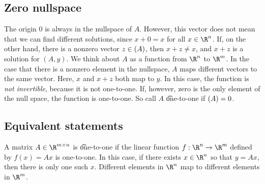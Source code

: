 \subsection*{Zero nullspace}

The origin $0$ is always in the nullspace of $A$.
However, this vector does not mean that we can find different solutions, since $x + 0 = x$ for all $x \in \R ^n$.
If, on the other hand, there is a nonzero vector $z \in \null(A)$, then $x + z \neq x$, and $x+z$ is a solution for $(A, y)$.
We think about $A$ as a function from $\R ^n$ to $\R ^m$.
In the case that there is a nonzero element in the nullspace, $A$ maps different vectors to the same vector.
Here, $x$ and $x + z$ both map to $y$.
In this case, the function is \textit{not invertible}, because it is not one-to-one.
If, however, zero is the only element of the null space, the function is one-to-one.
So call $A$ \t{one-to-one} if $\null(A) = 0$.

\subsection*{Equivalent statements}

A matrix $A \in \R ^{m \times  n}$ is \t{one-to-one} if the linear function $f: \R ^n \to \R ^m$ defined by $f(x) = Ax$ is one-to-one.
In this case, if there exists $x \in \R ^n$ so that $y = Ax$, then there is only one such $x$.
Different elements in $\R ^n$ map to different elements in $\R ^m$.

\blankpage